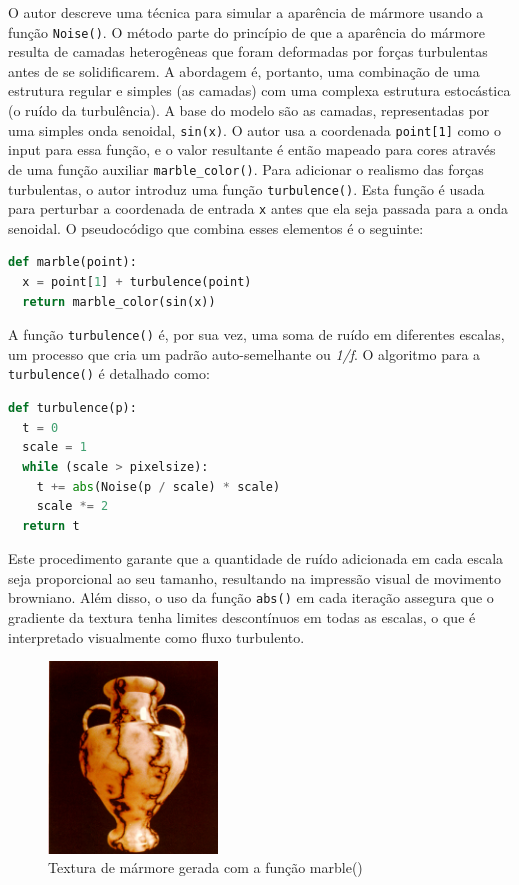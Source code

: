 O autor descreve uma técnica para simular a aparência de mármore usando a função \texttt{Noise()}. O método parte do princípio de que a aparência do mármore resulta de camadas heterogêneas que foram deformadas por forças turbulentas antes de se solidificarem. A abordagem é, portanto, uma combinação de uma estrutura regular e simples (as camadas) com uma complexa estrutura estocástica (o ruído da turbulência). A base do modelo são as camadas, representadas por uma simples onda senoidal, \texttt{sin(x)}. O autor usa a coordenada \texttt{point[1]} como o input para essa função, e o valor resultante é então mapeado para cores através de uma função auxiliar \texttt{marble\_color()}. Para adicionar o realismo das forças turbulentas, o autor introduz uma função \texttt{turbulence()}. Esta função é usada para perturbar a coordenada de entrada \texttt{x} antes que ela seja passada para a onda senoidal. O pseudocódigo que combina esses elementos é o seguinte:

\begin{lstlisting}[language=Python, caption={Pseudocódigo da função marble()}]
def marble(point):
  x = point[1] + turbulence(point)
  return marble_color(sin(x))
\end{lstlisting}

A função \texttt{turbulence()} é, por sua vez, uma soma de ruído em diferentes escalas, um processo que cria um padrão auto-semelhante ou \textit{1/f}. O algoritmo para a \texttt{turbulence()} é detalhado como:

\begin{lstlisting}[language=Python, caption={Pseudocódigo da função turbulence()}]
def turbulence(p):
  t = 0
  scale = 1
  while (scale > pixelsize):
    t += abs(Noise(p / scale) * scale)
    scale *= 2
  return t
\end{lstlisting}

Este procedimento garante que a quantidade de ruído adicionada em cada escala seja proporcional ao seu tamanho, resultando na impressão visual de movimento browniano. Além disso, o uso da função \texttt{abs()} em cada iteração assegura que o gradiente da textura tenha limites descontínuos em todas as escalas, o que é interpretado visualmente como fluxo turbulento.

\begin{figure}[H]
    \centering
    \includegraphics[width=0.4\textwidth]{img/marble.png}
    \caption{Textura de mármore gerada com a função marble()}
    \label{fig:marble_texture}
\end{figure}


